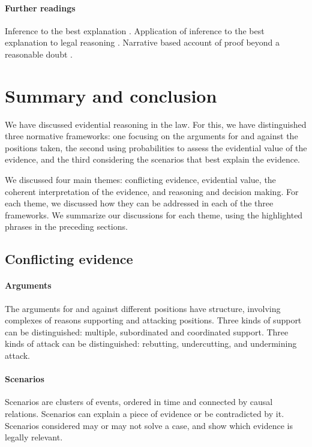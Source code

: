 \documentclass[10pt]{article}
\begin{document}
\paragraph{Further readings}

Inference to the best explanation \citep{lipton1991}.
Application of inference to the best explanation 
to legal reasoning \citep{pardoAllen2008}. 
Narrative based account of proof beyond a 
reasonable doubt \citep{allen2010, allenStein2013}.
















\section{Summary and conclusion}

We have discussed evidential reasoning in the law. For this, we have distinguished three normative frameworks: one focusing on the arguments for and against the positions taken, the second using probabilities to assess the evidential value of the evidence, and the third considering the scenarios that best explain the evidence. 

We discussed four main themes: conflicting evidence, evidential value, the coherent interpretation of the evidence, and reasoning and decision making. For each theme, we discussed how they can be addressed in each of the three frameworks. We summarize our discussions for each theme, using the highlighted phrases in the preceding sections.

\subsection{Conflicting evidence}

\paragraph{Arguments}
	The arguments for and against different positions have structure, involving complexes of reasons supporting and attacking positions.
	Three kinds of support can be distinguished: multiple, subordinated and coordinated support.
	Three kinds of attack can be distinguished: rebutting, undercutting, and undermining attack.

\paragraph{Scenarios}
	Scenarios are clusters of events, ordered in time and connected by causal relations.
	Scenarios can explain a piece of evidence or be contradicted by it.
	Scenarios considered may or may not solve a case, and show which evidence is legally relevant.
\end{document}
